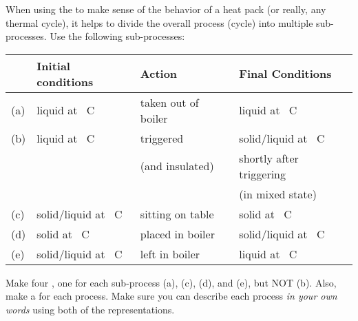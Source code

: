 \label{fnt1.1.3-2}

When using the \EnergyInteractionModel{} to make sense of the behavior of a heat pack (or really, any thermal cycle), it helps to divide the overall process (cycle) into multiple sub-processes.  Use the following sub-processes:

\begin{center}
\begin{tabular}{llll}
	\hline\hline
	&	Initial conditions	&	Action	&	Final Conditions\\
	\hline
	(a)	&	liquid at \unit[100]{\textdegree C}	&	taken out of boiler	&	liquid at \unit[23]{\textdegree C}\\
	(b)	&	liquid at \unit[23]{\textdegree C}	&	triggered	&	solid/liquid at \unit[54]{\textdegree C}\\&& (and insulated)	& shortly after triggering\\&&& (in mixed state)\\
	(c)	&	solid/liquid at \unit[54]{\textdegree C}	&	sitting on table	&	 solid at \unit[23]{\textdegree C}\\
	(d)	&	solid at \unit[23]{\textdegree C}	&	placed in boiler	&	solid/liquid at \unit[54]{\textdegree C}\\
	(e)	&	solid/liquid at \unit[54]{\textdegree C}	&	left in boiler	&	liquid at \unit[100]{\textdegree C}\\
	\hline\hline
\end{tabular}
\end{center}

\noindent Make four \EnergyDiagrams{}, one for each sub-process (a), (c), (d), and (e), but NOT (b). Also, make a \TempGraph{} for each process. Make sure you can describe each process {\em in your own words} using both of the representations. 